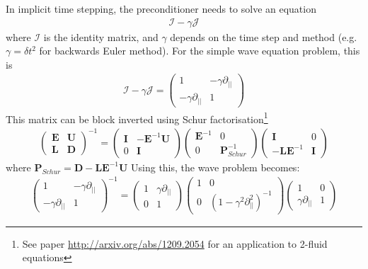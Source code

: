 \documentclass[12pt]{article}
\newcommand{\bb}[1]{\mathbf{#1}}
\def\L{\left}
\def\R{\right}
\begin{document}
In implicit time stepping, the preconditioner needs to solve an equation
%
\begin{align}
\mathcal{I} - \gamma \mathcal{J}
\end{align}
%
where $\mathcal{I}$ is the identity matrix, and $\gamma$ depends on the time
step and method (e.g. $\gamma = \delta t^2$ for backwards Euler method). For
the simple wave equation problem, this is
%
\begin{align}
\mathcal{I} - \gamma \mathcal{J} = \L(%
\begin{array}{cc}
1 & -\gamma\partial_{||} \\
-\gamma\partial_{||} & 1
\end{array}
%
\R)
\end{align}
%
This matrix can be block inverted using Schur factorisation\footnote{See paper
\url{http://arxiv.org/abs/1209.2054} for an application to 2-fluid equations}
%
\begin{align}
\L(%
\begin{array}{cc}
  \bb{E} & \bb{U} \\
  \bb{L} & \bb{D}
\end{array}\R)^{-1}
%
 = \L(%
\begin{array}{cc}
  \bb{I} & -\bb{E}^{-1}\bb{U} \\
  0 & \bb{I}
\end{array}
%
\R)\L(%
\begin{array}{cc}
  \bb{E}^{-1} & 0 \\
  0 & \bb{P}_{Schur}^{-1}
\end{array}
%
\R)\L(%
\begin{array}{cc}
  \bb{I} & 0 \\
  -\bb{L}\bb{E}^{-1} & \bb{I}
\end{array}
%
\R)
\end{align}
%
where $\bb{P}_{Schur} = \bb{D} - \bb{L}\bb{E}^{-1}\bb{U}$ Using this, the wave
problem becomes:
%
\begin{align}
\L(%
\begin{array}{cc}
1 & -\gamma\partial_{||} \\
-\gamma\partial_{||} & 1
\end{array}\R)^{-1}
%
 = \L(%
\begin{array}{cc}
1 & \gamma\partial_{||} \\
0 & 1
\end{array}
%
\R)\L(%
\begin{array}{cc}
1 & 0 \\
0 & \L(1 - \gamma^2\partial^2_{||}\R)^{-1}
\end{array}
%
\R)\L(%
\begin{array}{cc}
1 & 0 \\
\gamma\partial_{||} & 1
\end{array}
%
\R)
%
\label{eq:precon}
%
\end{align}
\end{document}
